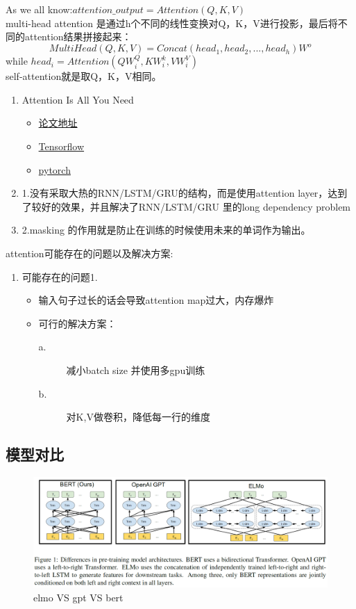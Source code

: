 \documentclass[UTF8]{article}%
\begin{document}
			As we all know:$attention\_output=Attention(Q,K,V)$\\
			multi-head attention 是通过h个不同的线性变换对Q，K，V进行投影，最后将不同的attention结果拼接起来：
			$$MultiHead(Q,K,V)=Concat(head_1,head_2,...,head_h)W^o$$
			while $head_i=Attention(QW_i^Q,KW_i^k,VW_i^V)$\\
			self-attention就是取Q，K，V相同。
			\begin{enumerate}
				\item Attention Is All You Need
				\begin{itemize}
					\item \href{https://arxiv.org/pdf/1706.03762.pdf}{论文地址}
					\item \href{https://github.com/Kyubyong/transformer}{Tensorflow}
					\item \href{https://github.com/jadore801120/attention-is-all-you-need-pytorch}{pytorch}
				\end{itemize}
				\item 1.没有采取大热的RNN/LSTM/GRU的结构，而是使用attention layer，达到了较好的效果，并且解决了RNN/LSTM/GRU 里的long dependency problem
				\item 2.masking 的作用就是防止在训练的时候使用未来的单词作为输出。
			\end{enumerate}
			attention可能存在的问题以及解决方案:
			\begin{enumerate}
				\item 可能存在的问题1.
				\begin{itemize}
					\item 输入句子过长的话会导致attention map过大，内存爆炸
					\item 可行的解决方案：
					\begin{description}
						\item[a.] 减小batch size 并使用多gpu训练
						\item[b.] 对K,V做卷积，降低每一行的维度
					\end{description}
				\end{itemize}
			\end{enumerate}
				\subsection{模型对比}
		\begin{figure}[h]%
			\centering  %
			\includegraphics[width=1.0\linewidth]{figures/elmo-gpt-bert}  %
			\caption{elmo VS gpt VS bert}  %
			\label{elmo-gpt-bert}   %
		\end{figure}
\end{document}

